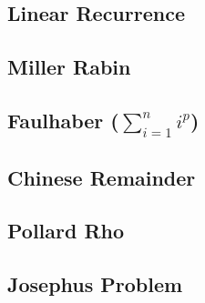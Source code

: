 \documentclass[a4paper,10pt,twocolumn,oneside]{article}
\begin{document}
% 

\subsection{Linear Recurrence}



\subsection{Miller Rabin}


% 

\subsection{Faulhaber ($\sum\limits_{i=1}^{n}i^p$)}


\subsection{Chinese Remainder}


\subsection{Pollard Rho}


\subsection{Josephus Problem}


%

%
\end{document}
